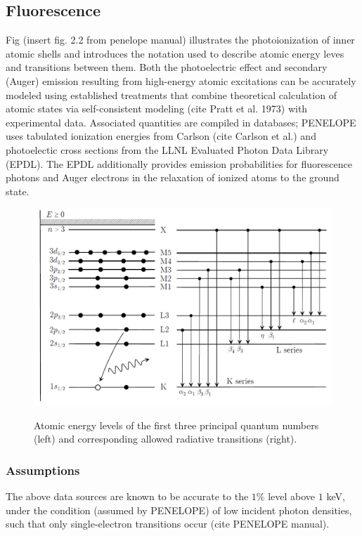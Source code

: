 \documentclass [11pt, proquest, article] {uwthesis}[2016/11/22]
\begin{document}
\subsection{Fluorescence}
Fig (insert fig. 2.2 from penelope manual) illustrates the photoionization of inner atomic shells and introduces the notation used to describe atomic energy leves and transitions between them.
Both the photoelectric effect and secondary (Auger) emission resulting from high-energy atomic excitations can be accurately modeled using established treatments that combine theoretical calculation of atomic states via self-consistent modeling (cite Pratt et al. 1973) with experimental data. Associated quantities are compiled in databases; PENELOPE uses tabulated ionization energies from Carlson (cite Carlson et al.) and photoelectic cross sections from the LLNL Evaluated Photon Data Library (EPDL). The EPDL additionally provides emission probabilities for fluorescence photons and Auger electrons in the relaxation of ionized atoms to the ground state.

\begin{figure}[h] 
\caption{Atomic energy levels of the first three principal quantum numbers (left) and corresponding allowed radiative transitions (right).}
\centering
\includegraphics[scale=0.4]{../Figures/penelope_2_2.png}
\label{fig:photoionization}
\end{figure}



\subsubsection{Assumptions}
The above data sources are known to be accurate to the $1\%$ level above $1$ keV, under the condition (assumed by PENELOPE) of low incident photon densities, such that only single-electron transitions occur (cite PENELOPE manual).
\end{document}
